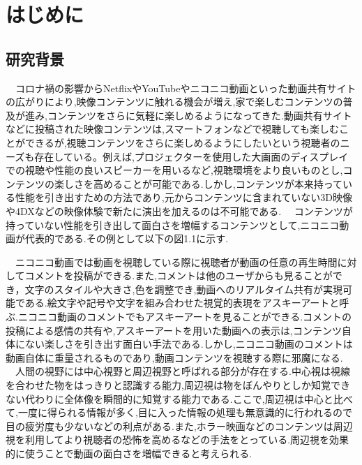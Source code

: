 \chapter{はじめに}
\thispagestyle{myheadings}

\section{研究背景}
　コロナ禍の影響からNetflixやYouTubeやニコニコ動画といった動画共有サイトの広がりにより,映像コンテンツに触れる機会が増え,家で楽しむコンテンツの普及が進み,コンテンツをさらに気軽に楽しめるようになってきた.動画共有サイトなどに投稿された映像コンテンツは,スマートフォンなどで視聴しても楽しむことができるが,視聴コンテンツをさらに楽しめるようにしたいという視聴者のニーズも存在している。例えば,プロジェクターを使用した大画面のディスプレイでの視聴や性能の良いスピーカーを用いるなど,視聴環境をより良いものとし,コンテンツの楽しさを高めることが可能である.しかし,コンテンツが本来持っている性能を引き出すための方法であり,元からコンテンツに含まれていない3D映像や4DXなどの映像体験で新たに演出を加えるのは不可能である.
　コンテンツが持っていない性能を引き出して面白さを増幅するコンテンツとして,ニコニコ動画が代表的である.その例として以下の図1.1に示す.

　ニコニコ動画では動画を視聴している際に視聴者が動画の任意の再生時間に対してコメントを投稿ができる.また,コメントは他のユーザからも見ることができ，文字のスタイルや大きさ,色を調整でき,動画へのリアルタイム共有が実現可能である.絵文字や記号や文字を組み合わせた視覚的表現をアスキーアートと呼ぶ.ニコニコ動画のコメントでもアスキーアートを見ることができる.コメントの投稿による感情の共有や,アスキーアートを用いた動画への表示は,コンテンツ自体にない楽しさを引き出す面白い手法である.しかし,ニコニコ動画のコメントは動画自体に重量されるものであり,動画コンテンツを視聴する際に邪魔になる.
　人間の視野には中心視野と周辺視野と呼ばれる部分が存在する.中心視は視線を合わせた物をはっきりと認識する能力,周辺視は物をぼんやりとしか知覚できない代わりに全体像を瞬間的に知覚する能力である.ここで,周辺視は中心と比べて,一度に得られる情報が多く,目に入った情報の処理も無意識的に行われるので目の疲労度も少ないなどの利点がある.また,ホラー映画などのコンテンツは周辺視を利用してより視聴者の恐怖を高めるなどの手法をとっている.周辺視を効果的に使うことで動画の面白さを増幅できると考えられる.



